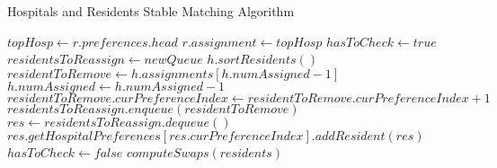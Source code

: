 \documentclass[letterpaper, 10pt,DIV=13]{scrartcl}
\numberwithin{equation}{section} %
\numberwithin{figure}{section} %
\numberwithin{table}{section} %
\begin{document}
\begin{algorithm}
    \caption{Hospitals and Residents Stable Matching Algorithm}
    \label{algorithm:variation}
    \begin{algorithmic}[1]
              \State $topHosp \gets r.preferences.head$
              \State $r.assignment \gets topHosp$ 
          \EndFor
          \State $hasToCheck \gets true$
            \State $residentsToReassign \gets new Queue$
              \State $h.sortResidents()$ 
                \State $residentToRemove \gets h.assignments[h.numAssigned - 1]$ 
                \State $h.numAssigned \gets h.numAssigned - 1$
                \State $residentToRemove.curPreferenceIndex \gets residentToRemove.curPreferenceIndex + 1$
                \State $residentsToReassign.enqueue(residentToRemove)$ 
              \EndWhile
            \EndFor
                \State $res \gets residentsToReassign.dequeue()$
                 
                  \State $res.getHospitalPreferences[res.curPreferenceIndex].addResident(res)$
                \EndIf
              \EndWhile
            \Else
              \State $hasToCheck \gets false$ 
            \EndIf
          \EndWhile
          \State $computeSwaps(residents)$ 
        \EndProcedure
    \end{algorithmic}
  \end{algorithm}
\end{document}
